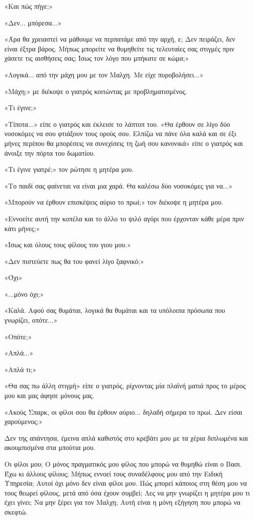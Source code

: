 \documentclass[12pt,twoside, openany]{book}
\begin{document}
«Και πώς πήγε;»

«Δεν... μπόρεσα...»

«Άρα θα χρειαστεί να μάθουμε να περπατάμε από την αρχή, ε; Δεν πειράζει, δεν είναι έξτρα βάρος. Μήπως μπορείτε να θυμηθείτε τις τελευταίες σας στιγμές πριν χάσετε τις αισθήσεις σας; Ίσως τον λόγο που μπήκατε σε κώμα;»

«Λογικά... από την μάχη μου με τον Μαλχη. Με είχε πυροβολήσει...»

«Μάχη;» με διέκοψε ο γιατρός κοιτώντας με προβληματισμένος.

«Τι έγινε;»

«Τίποτα...» είπε ο γιατρός και έκλεισε το λάπτοπ του. «Θα έρθουν σε λίγο δύο νοσοκόμες να σου φτιάξουν τους ορούς σου. Ελπίζω να πάνε όλα καλά και σε έξι μήνες περίπου θα μπορέσεις να συνεχίσεις τη ζωή σου κανονικά» είπε ο γιατρός και άνοιξε την πόρτα του δωματίου.

«Τι έγινε γιατρέ;» τον ρώτησε η μητέρα μου.

«Το παιδί σας φαίνεται να είναι μια χαρά. Θα καλέσω δύο νοσοκόμες για να...»

«Μπορούν να έρθουν επισκέψεις αύριο το πρωί;» τον διέκοψε η μητέρα μου.

«Εννοείτε αυτή την κοπέλα και το άλλο το ψιλό αγόρι που έρχονταν κάθε μέρα πριν κάτι μήνες;»

«Ίσως και όλους τους φίλους του γιου μου.»

«Δεν πιστεύετε πως θα του φανεί λίγο ξαφνικό;»

«Όχι»

«...μόνο όχι;»

«Καλά. Αφού σας θυμάται, λογικά θα θυμάται και τα υπόλοιπα πρόσωπα που γνωρίζει, οπότε...»

«Οπότε;»

«Απλά...»

«Απλά τι;»

«Θα σας πω άλλη στιγμή» είπε ο γιατρός, ρίχνοντας μία πλαϊνή ματιά προς το μέρος μου και μας άφησε μόνους μας.

«Ακούς Σπαρκ, οι φίλοι σου θα έρθουν αύριο... δηλαδή σήμερα το πρωί. Δεν είσαι χαρούμενος;»

Δεν της απάντησα, έμεινα απλά καθιστός στο κρεβάτι μου με τα χέρια διπλωμένα και ακουμπισμένα στα μπούτια μου.

Οι φίλοι μου; Ο μόνος πραγματικός μου φίλος που μπορώ να θυμηθώ είναι ο Βασι. Έχω κι άλλους φίλους; Μήπως εννοεί τους συναδέλφους μου από την Ειδική Υπηρεσία; Αυτοί όχι μόνο δεν είναι φίλοι μου. Πώς μπορεί κάποιος στη θέση μου να τους θεωρεί φίλους, μετά από όσα έχουν συμβεί; Λες να μην γνωρίζει η μητέρα μου τι έχει γίνει; Να μην ξέρει για τον Μαλχη; Αυτή είναι η μόνη εξήγηση που μπορώ να σκεφτώ.
\end{document}
